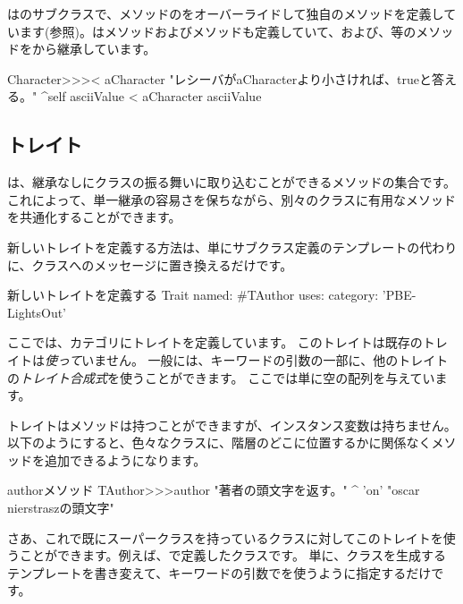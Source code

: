 \documentclass[a4paper,10pt,twoside]{book}
\begin{document}
はのサブクラスで、\ct{<}メソッドのをオーバーライドして独自のメソッドを定義しています(参照)。は\ct{=}メソッドおよびメソッドも定義していて、\ct{>=}および\ct{<=}、\ct{~=}等のメソッドをから継承しています。

\begin{method}[CharacterLessThan]{}
Character>>>< aCharacter 
	"レシーバがaCharacterより小さければ、trueと答える。"
	^self asciiValue < aCharacter asciiValue
\end{method}

\subsection{トレイト}
は、継承なしにクラスの振る舞いに取り込むことができるメソッドの集合です。
これによって、単一継承の容易さを保ちながら、別々のクラスに有用なメソッドを共通化することができます。

新しいトレイトを定義する方法は、単にサブクラス定義のテンプレートの代わりに、クラスへのメッセージに置き換えるだけです。

\begin{classdef}[tauthor]{新しいトレイトを定義する}
Trait named: #TAuthor
	uses: { }
	category: 'PBE-LightsOut'
\end{classdef}

\noindent
ここでは、カテゴリにトレイトを定義しています。
このトレイトは既存のトレイトは\emph{使って}いません。
一般には、キーワードの引数の一部に、他のトレイトの\emph{トレイト合成式}を使うことができます。
ここでは単に空の配列を与えています。

トレイトはメソッドは持つことができますが、インスタンス変数は持ちません。
以下のようにすると、色々なクラスに、階層のどこに位置するかに関係なくメソッドを追加できるようになります。

\begin{method}[author]{authorメソッド}
TAuthor>>>author
    "著者の頭文字を返す。"
	^ 'on'    "oscar nierstraszの頭文字"
\end{method}

\noindent
さあ、これで既にスーパークラスを持っているクラスに対してこのトレイトを使うことができます。例えば、で定義したクラスです。
単に、クラスを生成するテンプレートを書き変えて、キーワードの引数でを使うように指定するだけです。
\end{document}
